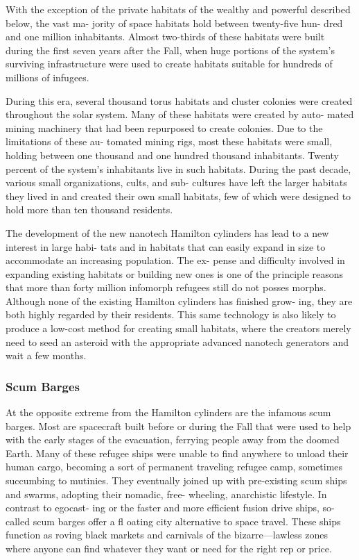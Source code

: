 With the exception of the private habitats of the 
wealthy and powerful described below, the vast ma-
jority of space habitats hold between twenty-five hun-
dred and one million inhabitants. Almost two-thirds 
of these habitats were built during the first seven years 
after the Fall, when huge portions of the system's 
surviving infrastructure were used to create habitats 
suitable for hundreds of millions of infugees.

During this era, several thousand torus habitats 
and cluster colonies were created throughout the solar 
system. Many of these habitats were created by auto-
mated mining machinery that had been repurposed 
to create colonies. Due to the limitations of these au-
tomated mining rigs, most these habitats were small, 
holding between one thousand and one hundred 
thousand inhabitants. Twenty percent of the system's 
inhabitants live in such habitats. During the past 
decade, various small organizations, cults, and sub-
cultures have left the larger habitats they lived in and 
created their own small habitats, few of which were 
designed to hold more than ten thousand residents.

The development of the new nanotech Hamilton 
cylinders has lead to a new interest in large habi-
tats and in habitats that can easily expand in size 
to accommodate an increasing population. The ex-
pense and difficulty involved in expanding existing 
habitats or building new ones is one of the principle 
reasons that more than forty million infomorph 
refugees still do not posses morphs. Although none 
of the existing Hamilton cylinders has finished grow-
ing, they are both highly regarded by their residents. 
This same technology is also likely to produce a 
low-cost method for creating small habitats, where 
the creators merely need to seed an asteroid with the 
appropriate advanced nanotech generators and wait 
a few months.

\subsubsection{Scum Barges}

At the opposite extreme from the Hamilton cylinders 
are the infamous scum barges. Most are spacecraft 
built before or during the Fall that were used to 
help with the early stages of the evacuation, ferrying 
people away from the doomed Earth. Many of these 
refugee ships were unable to find anywhere to unload 
their human cargo, becoming a sort of permanent 
traveling refugee camp, sometimes succumbing to 
mutinies. They eventually joined up with pre-existing 
scum ships and swarms, adopting their nomadic, free-
wheeling, anarchistic lifestyle. In contrast to egocast-
ing or the faster and more efficient fusion drive ships, 
so-called scum barges offer a fl oating city alternative 
to space travel. These ships function as roving black 
markets and carnivals of the bizarre—lawless zones 
where anyone can find whatever they want or need for 
the right rep or price.

